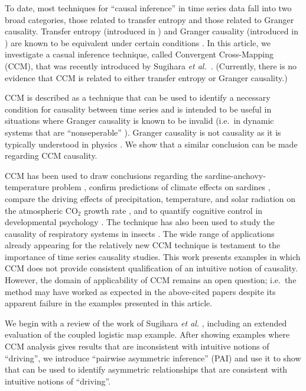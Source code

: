 \documentclass[twocolumn,aps,pre,groupedaddress]{revtex4-1}
\begin{document}
To date, most techniques for ``causal inference'' in time series data fall into two broad categories, those related to transfer entropy and those related to Granger causality.  Transfer entropy (introduced in \cite{Schreiber2000}) and Granger causality (introduced in \cite{granger1969}) are known to be equivalent under certain conditions \cite{Barnett2009}.  In this article, we investigate a casual inference technique, called Convergent Cross-Mapping (CCM), that was recently introduced by Sugihara {\em et al.\ }\cite{Sugihara2012}.  (Currently, there is no evidence that CCM is related to either transfer entropy or Granger causality.)

CCM is described as a technique that can be used to identify a necessary condition for causality between time series and is intended to be useful in situations where Granger causality is known to be invalid (i.e.\ in dynamic systems that are ``nonseperable'' \cite{Sugihara2012}). Granger causality is not causality as it is typically understood in physics \cite{Granger1980,liu2012,Roberts1985}.  We show that a similar conclusion can be made regarding CCM causality. 

CCM has been used to draw conclusions regarding the sardine-anchovy-temperature problem \cite{Sugihara2012}, confirm predictions of climate effects on sardines \cite{Deyle2013}, compare the driving effects of precipitation, temperature, and solar radiation on the atmospheric CO$_2$ growth rate \cite{Wang2014}, and to quantify cognitive control in developmental psychology \cite{Anastas2013}.  The technique has also been used to study the causality of respiratory systems in insects \cite{Bozorgmagham2013}.  The wide range of applications already appearing for the relatively new CCM technique is testament to the importance of time series causality studies.  This work presents examples in which CCM does not provide consistent qualification of an intuitive notion of causality.  However, the domain of applicability of CCM remains an open question; i.e.\ the method may have worked as expected in the above-cited papers despite its apparent failure in the examples presented in this article. 

We begin with a review of the work of Sugihara {\em et al.} \cite{Sugihara2012}, including an extended evaluation of the coupled logistic map example.  After showing examples where CCM analysis gives results that are inconsistent with intuitive notions of ``driving'', we introduce ``pairwise asymmetric inference'' (PAI) and use it to show that can be used to identify asymmetric relationships that are consistent with intuitive notions of ``driving''.
\end{document}
